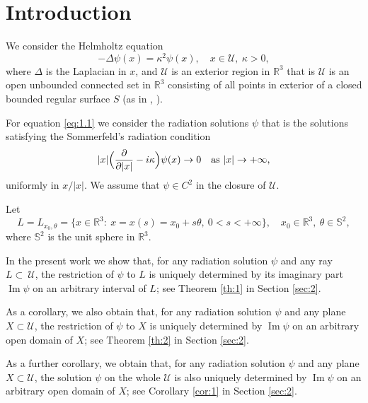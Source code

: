 \documentclass[JEP,XML,SOM,Unicode,NoEqCountersInSection,published]{cedram}
\let\ra\rightarrow
\newcommand{\RR}{\mathbb R}
\renewcommand{\Im}{\mathop{\mathrm{Im}}}
\theoremstyle{definition}
\begin{document}
\maketitle
\tableofcontents
\mainmatter

\section{Introduction}\label{sec:1}

We consider the Helmholtz equation
\begin{equation}
\label{eq:1.1}
-\Delta\psi(x) = \kappa^2 \psi(x),\quad x\in \mathcal{U},\ \kappa>0,
\end{equation}
where $\Delta$ is the Laplacian in $x$, and $\mathcal U$ is an exterior region in $\RR^3$
that is $\mathcal U$ is an open unbounded connected set in $\RR^3$ consisting of all points in exterior of a closed bounded regular surface $S$ (as in \cite{A}, \cite{W}).

For equation \eqref{eq:1.1} we consider the radiation solutions $\psi$ that is the solutions satisfying the Sommerfeld's radiation condition
\begin{equation}\label{eq:1.2}
|x|\Bigl(\frac{\partial}{\partial|x|}-i\kappa\Bigr)\psi(x)\to 0\quad \mbox{as} \ |x|\ra +\infty,
\end{equation}
uniformly in $x/|x|$. We assume that $\psi \in C^2$ in the closure of $\mathcal{U}$.

Let
\begin{equation}\label{eq:1.3}
L=L_{x_0, \theta}=\{x\in\RR^3:\ x=x(s)=x_0+s\theta,\ 0<s <+\infty \}, \quad x_0\in\RR^3, \ \theta\in\mathbb S^2,
\end{equation}
where $\mathbb S^2$ is the unit sphere in $\RR^3$.

In the present work we show that, for any radiation solution $\psi$ and any ray $L\subset ~\mathcal{U}$,
the restriction of $\psi$ to $L$ is uniquely determined by its imaginary part $\Im\psi$ on an arbitrary interval of $L$;
see Theorem \ref{th:1} in Section \ref{sec:2}.

As a corollary, we also obtain that, for any radiation solution $\psi$ and any plane $X\subset \mathcal{U}$, the restriction of $\psi$ to $X$ is uniquely determined by $\Im\psi$
on an arbitrary open domain of $X$; see Theorem \ref{th:2} in Section \ref{sec:2}.

As a further corollary, we obtain that, for any radiation solution $\psi$ and any plane $X\subset \mathcal{U}$, the solution $\psi$ on the whole $\mathcal{U}$ is also uniquely determined by $\Im\psi$
on an arbitrary open domain of $X$; see Corollary \ref{cor:1} in Section \ref{sec:2}.
\end{document}
